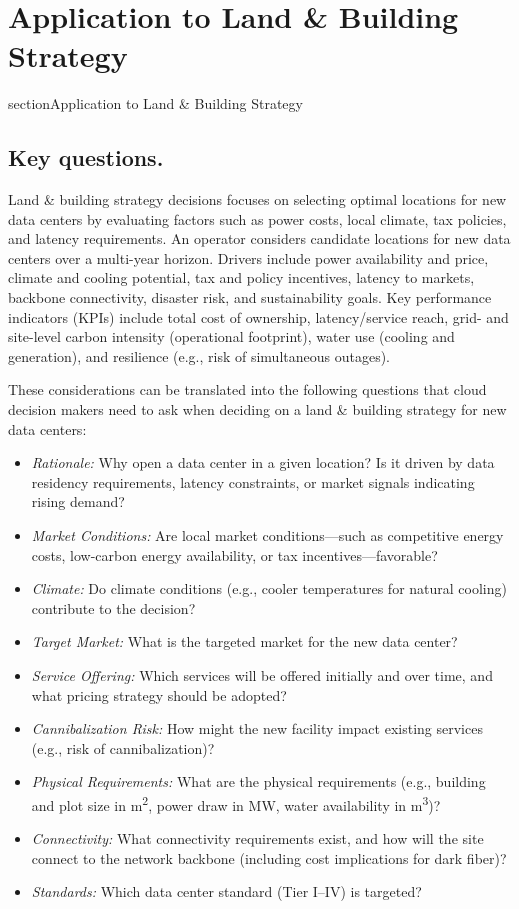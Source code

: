 \documentclass[pdflatex,sn-mathphys-num]{sn-jnl}
\theoremstyle{thmstyleone}
\theoremstyle{thmstyletwo}
\theoremstyle{thmstylethree}
\begin{document}
\section{Application to Land \& Building Strategy} \label{sec:example}
section{Application to Land \& Building Strategy} 

\subsection{Key questions.}

Land \& building strategy decisions focuses on selecting optimal locations for new data centers by evaluating factors such as power costs, local climate, tax policies, and latency requirements.
An operator considers candidate locations for new data centers over a multi-year horizon. Drivers include power availability and price, climate and cooling potential, tax and policy incentives, latency to markets, backbone connectivity, disaster risk, and sustainability goals. 
Key performance indicators (KPIs) include total cost of ownership, latency/service reach, grid- and site-level carbon intensity (operational footprint), water use (cooling and generation), and resilience (e.g., risk of simultaneous outages).

These considerations can be translated into the following questions that cloud decision makers need to ask when deciding on a land \& building strategy for new data centers:
\begin{itemize}
    \item \emph{Rationale:} Why open a data center in a given location? Is it driven by data residency requirements, latency constraints, or market signals indicating rising demand?
    \item \emph{Market Conditions:} Are local market conditions—such as competitive energy costs, low-carbon energy availability, or tax incentives—favorable?
    \item \emph{Climate:} Do climate conditions (e.g., cooler temperatures for natural cooling) contribute to the decision?
    \item \emph{Target Market:} What is the targeted market for the new data center?
    \item \emph{Service Offering:} Which services will be offered initially and over time, and what pricing strategy should be adopted?
    \item \emph{Cannibalization Risk:} How might the new facility impact existing services (e.g., risk of cannibalization)?
    \item \emph{Physical Requirements:} What are the physical requirements (e.g., building and plot size in m\textsuperscript{2}, power draw in MW, water availability in m\textsuperscript{3})?
    \item \emph{Connectivity:} What connectivity requirements exist, and how will the site connect to the network backbone (including cost implications for dark fiber)?
    \item \emph{Standards:} Which data center standard (Tier I–IV) is targeted?
\end{itemize}
\end{document}
